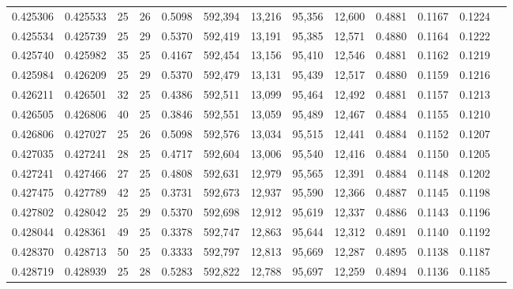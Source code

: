 \begin{tabular}{rrrrrrrrrrrrr}
0.425306 & 0.425533 &    25 &  26 &                                     0.5098 & 592,394 &  13,216 &  95,356 &  12,600 & 0.4881 & 0.1167 & 0.1224 \\
0.425534 & 0.425739 &    25 &  29 &                                     0.5370 & 592,419 &  13,191 &  95,385 &  12,571 & 0.4880 & 0.1164 & 0.1222 \\
0.425740 & 0.425982 &    35 &  25 &                                     0.4167 & 592,454 &  13,156 &  95,410 &  12,546 & 0.4881 & 0.1162 & 0.1219 \\
0.425984 & 0.426209 &    25 &  29 &                                     0.5370 & 592,479 &  13,131 &  95,439 &  12,517 & 0.4880 & 0.1159 & 0.1216 \\
0.426211 & 0.426501 &    32 &  25 &                                     0.4386 & 592,511 &  13,099 &  95,464 &  12,492 & 0.4881 & 0.1157 & 0.1213 \\
0.426505 & 0.426806 &    40 &  25 &                                     0.3846 & 592,551 &  13,059 &  95,489 &  12,467 & 0.4884 & 0.1155 & 0.1210 \\
0.426806 & 0.427027 &    25 &  26 &                                     0.5098 & 592,576 &  13,034 &  95,515 &  12,441 & 0.4884 & 0.1152 & 0.1207 \\
0.427035 & 0.427241 &    28 &  25 &                                     0.4717 & 592,604 &  13,006 &  95,540 &  12,416 & 0.4884 & 0.1150 & 0.1205 \\
0.427241 & 0.427466 &    27 &  25 &                                     0.4808 & 592,631 &  12,979 &  95,565 &  12,391 & 0.4884 & 0.1148 & 0.1202 \\
0.427475 & 0.427789 &    42 &  25 &                                     0.3731 & 592,673 &  12,937 &  95,590 &  12,366 & 0.4887 & 0.1145 & 0.1198 \\
0.427802 & 0.428042 &    25 &  29 &                                     0.5370 & 592,698 &  12,912 &  95,619 &  12,337 & 0.4886 & 0.1143 & 0.1196 \\
0.428044 & 0.428361 &    49 &  25 &                                     0.3378 & 592,747 &  12,863 &  95,644 &  12,312 & 0.4891 & 0.1140 & 0.1192 \\
0.428370 & 0.428713 &    50 &  25 &                                     0.3333 & 592,797 &  12,813 &  95,669 &  12,287 & 0.4895 & 0.1138 & 0.1187 \\
0.428719 & 0.428939 &    25 &  28 &                                     0.5283 & 592,822 &  12,788 &  95,697 &  12,259 & 0.4894 & 0.1136 & 0.1185 \\

\end{tabular}
